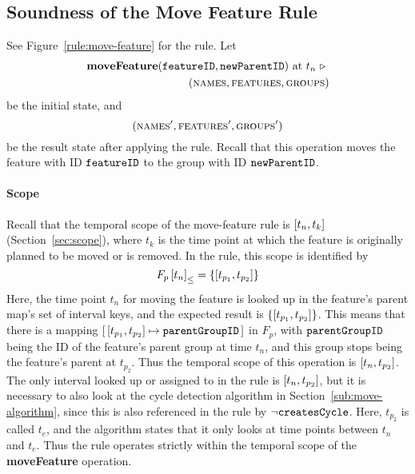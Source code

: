 \subsection{Soundness of the Move Feature Rule}
\label{sub:soundness-of-the-move-reature-rule}


See Figure~\vref{rule:move-feature} for the  rule. Let 
\begin{equation*}
   \begin{split}
      \textbf{moveFeature}(\texttt{featureID}, \texttt{newParentID}) \text{ at } t_n \ \triangleright \  \\
      (\textsc{names}, \textsc{features}, \textsc{groups}{})
   \end{split}
\end{equation*}
be the initial state, and
\[
   (\textsc{names}', \textsc{features}', \textsc{groups}{}')
\]
be the result state after applying the  rule. Recall that this operation moves the feature with ID $\texttt{featureID}$ to the group with ID $\texttt{newParentID}$.

\paragraph{Scope}
\label{par:scope}
Recall that the temporal scope of the move-feature rule is $\interval{t_n}{t_k}$ (Section~\vref{sec:scope}), where $t_k$ is the time point at which the feature is originally planned to be moved or is removed. In the rule, this scope is identified by 
   \[
      \containing{F_p}{t_n} = \set{\interval{t_{p_1}}{t_{p_2}}}
   \]
   Here, the time point $t_n$ for moving the feature is looked up in the feature's parent map's set of interval keys, and the expected result is $\set{\interval{t_{p_1}}{t_{p_2}}}$. This means that there is a mapping $\intervalmapping{t_{p_1}}{t_{p_2}}{\var{parentGroupID}}$ in $F_p$, with $\texttt{parentGroupID}$ being the ID of the feature's parent group at time $t_n$, and this group stops being the feature's parent at $t_{p_2}$. Thus the temporal scope of this operation is $\interval{t_n}{t_{p_2}}$. The only interval looked up or assigned to in the rule is $\interval{t_n}{t_{p_2}}$, but it is necessary to also look at the cycle detection algorithm in Section~\vref{sub:move-algorithm}, since this is also referenced in the rule by $\neg \texttt{createsCycle}$. Here, $t_{p_2}$ is called $t_e$, and the algorithm states that it only looks at time points between $t_n$ and $t_e$. Thus the rule operates strictly within the temporal scope of the \textbf{moveFeature} operation.

